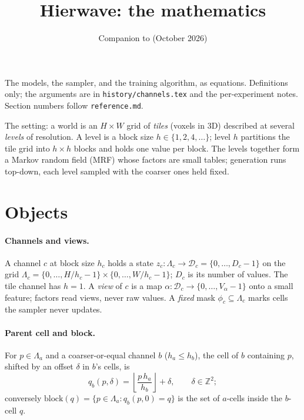 \documentclass[11pt]{article}
\title{Hierwave: the mathematics}
\author{Companion to \code{notes/reference.md} (October 2026)}
\date{}
\newcommand{\Z}{\mathbb{Z}}
\newcommand{\1}{\mathds{1}}
\newcommand{\Dom}{\mathcal{D}}
\newcommand{\code}[1]{\texttt{#1}}
\begin{document}
\sloppy
\maketitle

\noindent The models, the sampler, and the training algorithm, as equations.
Definitions only; the arguments are in \code{history/channels.tex} and the
per-experiment notes. Section numbers follow \code{reference.md}.

The setting: a world is an $H \times W$ grid of \emph{tiles} (voxels in 3D) described at
several \emph{levels} of resolution. A level is a block size $h \in \{1, 2, 4, \dots\}$; level
$h$ partitions the tile grid into $h \times h$ blocks and holds one value per block. The
levels together form a Markov random field (MRF) whose factors are small tables; generation
runs top-down, each level sampled with the coarser ones held fixed.

\section{Objects}

\paragraph{Channels and views.} A channel $c$ at block size $h_c$ holds a state
$z_c : \Lambda_c \to \Dom_c = \{0, \dots, D_c - 1\}$ on the grid
$\Lambda_c = \{0, \dots, H/h_c - 1\} \times \{0, \dots, W/h_c - 1\}$; $D_c$ is its number of
values. The tile channel has $h = 1$. A \emph{view} of $c$ is a map
$\alpha : \Dom_c \to \{0, \dots, V_\alpha - 1\}$ onto a small feature; factors read views,
never raw values. A \emph{fixed} mask $\phi_c \subseteq \Lambda_c$ marks cells the sampler
never updates.

\paragraph{Parent cell and block.} For $p \in \Lambda_a$ and a coarser-or-equal channel $b$
($h_a \le h_b$), the cell of $b$ containing $p$, shifted by an offset $\delta$ in $b$'s cells, is
\begin{equation}
  q_b(p, \delta) = \left\lfloor \frac{p\, h_a}{h_b} \right\rfloor + \delta, \qquad \delta \in \Z^2 ;
\end{equation}
conversely $\mathrm{block}(q) = \{p \in \Lambda_a : q_b(p, 0) = q\}$ is the set of $a$-cells
inside the $b$-cell $q$.
\end{document}
